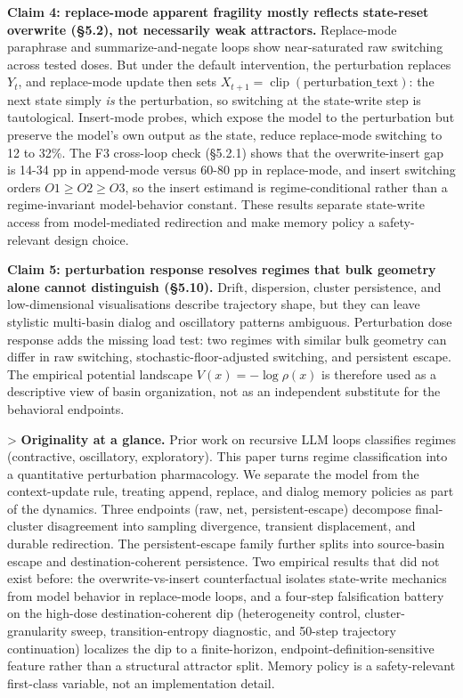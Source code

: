 \documentclass{article}
\theoremstyle{plain}
\theoremstyle{definition}
\begin{document}
\textbf{Claim 4: replace-mode apparent fragility mostly reflects state-reset overwrite (§5.2), not necessarily weak attractors.} Replace-mode paraphrase and summarize-and-negate loops show near-saturated raw switching across tested doses. But under the default intervention, the perturbation replaces \(Y_t\), and replace-mode update then sets \(X_{t+1}=\operatorname{clip}(\text{perturbation\_text})\): the next state simply \textit{is} the perturbation, so switching at the state-write step is tautological. Insert-mode probes, which expose the model to the perturbation but preserve the model's own output as the state, reduce replace-mode switching to 12 to 32\%. The F3 cross-loop check (§5.2.1) shows that the overwrite-insert gap is 14-34 pp in append-mode versus 60-80 pp in replace-mode, and insert switching orders \(O1 \ge O2 \ge O3\), so the insert estimand is regime-conditional rather than a regime-invariant model-behavior constant. These results separate state-write access from model-mediated redirection and make memory policy a safety-relevant design choice.

\textbf{Claim 5: perturbation response resolves regimes that bulk geometry alone cannot distinguish (§5.10).} Drift, dispersion, cluster persistence, and low-dimensional visualisations describe trajectory shape, but they can leave stylistic multi-basin dialog and oscillatory patterns ambiguous. Perturbation dose response adds the missing load test: two regimes with similar bulk geometry can differ in raw switching, stochastic-floor-adjusted switching, and persistent escape. The empirical potential landscape $V(x) = -\log \rho(x)$ is therefore used as a descriptive view of basin organization, not as an independent substitute for the behavioral endpoints.

> \textbf{Originality at a glance.} Prior work on recursive LLM loops classifies regimes (contractive, oscillatory, exploratory). This paper turns regime classification into a quantitative perturbation pharmacology. We separate the model from the context-update rule, treating append, replace, and dialog memory policies as part of the dynamics. Three endpoints (raw, net, persistent-escape) decompose final-cluster disagreement into sampling divergence, transient displacement, and durable redirection. The persistent-escape family further splits into source-basin escape and destination-coherent persistence. Two empirical results that did not exist before: the overwrite-vs-insert counterfactual isolates state-write mechanics from model behavior in replace-mode loops, and a four-step falsification battery on the high-dose destination-coherent dip (heterogeneity control, cluster-granularity sweep, transition-entropy diagnostic, and 50-step trajectory continuation) localizes the dip to a finite-horizon, endpoint-definition-sensitive feature rather than a structural attractor split. Memory policy is a safety-relevant first-class variable, not an implementation detail.
\end{document}
